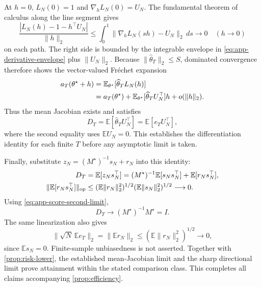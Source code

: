 \documentclass[10pt,twoside,letterpaper]{article}
\newcommand{\E}{\mathbb E}
\newcommand{\op}{\mathrm{op}}
\newcommand{\norm}[1]{\lVert #1\rVert}
\begin{document}
At $h=0$, $L_N(0)=1$ and $\nabla_hL_N(0)=U_N$.
The fundamental theorem of calculus along the line segment gives
\begin{equation}
\frac{|L_N(h)-1-h^\top U_N|}{\norm{h}_2}
\le\int_0^1\norm{\nabla_hL_N(sh)-U_N}_2\,ds
\longrightarrow0\quad(h\to0)
\label{eq:app-frechet-likelihood}
\end{equation}
on each path. The right side is bounded by the integrable envelope in
\eqref{eq:app-derivative-envelope} plus $\norm{U_N}_2$.
Because $\norm{\widehat\theta_T}_2\le S$, dominated convergence
therefore shows the vector-valued Fr\'echet expansion
\begin{align}
a_T(\theta^\star+h)
&=\E_{\theta^\star}[\widehat\theta_T L_N(h)]\notag\\
&=a_T(\theta^\star)
 +\E_{\theta^\star}[\widehat\theta_TU_N^\top]h
 +o(\norm{h}_2).
\label{eq:app-mean-differentiation-expansion}
\end{align}
Thus the mean Jacobian exists and satisfies
\begin{equation}
D_T=\E[\widehat\theta_TU_N^\top]=\E[e_TU_N^\top],
\label{eq:app-mle-mean-derivative}
\end{equation}
where the second equality uses $\E U_N=0$.
This establishes the differentiation identity for each finite $T$
before any asymptotic limit is taken.

Finally, substitute $z_N=(M^\star)^{-1}s_N+r_N$ into this identity:
\begin{align}
D_T
&=\E[z_Ns_N^\top]
=(M^\star)^{-1}\E[s_Ns_N^\top]+\E[r_Ns_N^\top],\notag\\
\norm{\E[r_Ns_N^\top]}_{\op}
&\le(\E\norm{r_N}_2^2)^{1/2}
 (\E\norm{s_N}_2^2)^{1/2}\longrightarrow0.
\label{eq:app-derivative-remainder}
\end{align}
Using \eqref{eq:app-score-second-limit},
\begin{equation}
D_T\longrightarrow(M^\star)^{-1}M^\star=I.
\label{eq:app-derivative-limit}
\end{equation}
The same linearization also gives
\begin{equation}
\norm{\sqrt N\,\E e_T}_2
=\norm{\E r_N}_2
\le(\E\norm{r_N}_2^2)^{1/2}\longrightarrow0,
\label{eq:app-asymptotic-bias}
\end{equation}
since $\E s_N=0$. Finite-sample unbiasedness is not asserted.
Together with \cref{prop:risk-lower}, the established mean-Jacobian
limit and the sharp directional limit prove attainment within the
stated comparison class. This completes all claims accompanying
\cref{prop:efficiency}.
\end{document}
